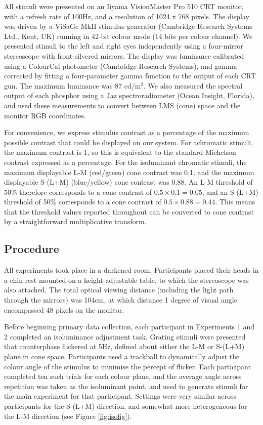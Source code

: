 \documentclass[
]{article}
\begin{document}
All stimuli were presented on an Iiyama VisionMaster Pro 510 CRT monitor, with a refresh rate of 100Hz, and a resolution of 1024 x 768 pixels. The display was driven by a ViSaGe MkII stimulus generator (Cambridge Research Systems Ltd., Kent, UK) running in 42-bit colour mode (14 bits per colour channel). We presented stimuli to the left and right eyes independently using a four-mirror stereoscope with front-silvered mirrors. The display was luminance calibrated using a ColourCal photometer (Cambridge Research Systems), and gamma corrected by fitting a four-parameter gamma function to the output of each CRT gun. The maximum luminance was 87 cd/m\(^2\). We also measured the spectral output of each phosphor using a Jaz spectroradiometer (Ocean Insight, Florida), and used these measurements to convert between LMS (cone) space and the monitor RGB coordinates.

For convenience, we express stimulus contrast as a percentage of the maximum possible contrast that could be displayed on our system. For achromatic stimuli, the maximum contrast is 1, so this is equivalent to the standard Michelson contrast expressed as a percentage. For the isoluminant chromatic stimuli, the maximum displayable L-M (red/green) cone contrast was 0.1, and the maximum displayable S-(L+M) (blue/yellow) cone contrast was 0.88. An L-M threshold of 50\% therefore corresponds to a cone contrast of \(0.5\times0.1 = 0.05\), and an S-(L+M) threshold of 50\% corresponds to a cone contrast of \(0.5\times0.88 = 0.44\). This means that the threshold values reported throughout can be converted to cone contrast by a straightforward multiplicative transform.

\hypertarget{procedure}{%
\subsection{Procedure}\label{procedure}}

All experiments took place in a darkened room. Participants placed their heads in a chin rest mounted on a height-adjustable table, to which the stereoscope was also attached. The total optical viewing distance (including the light path through the mirrors) was 104cm, at which distance 1 degree of visual angle encompassed 48 pixels on the monitor.

Before beginning primary data collection, each participant in Experiments 1 and 2 completed an isoluminance adjustment task. Grating stimuli were presented that counterphase flickered at 5Hz, defined about either the L-M or S-(L+M) plane in cone space. Participants used a trackball to dynamically adjust the colour angle of the stimulus to minimise the percept of flicker. Each participant completed ten such trials for each colour plane, and the average angle across repetition was taken as the isoluminant point, and used to generate stimuli for the main experiment for that participant. Settings were very similar across participants for the S-(L+M) direction, and somewhat more heterogeneous for the L-M direction (see Figure \ref{fig:isofig}).
\end{document}
